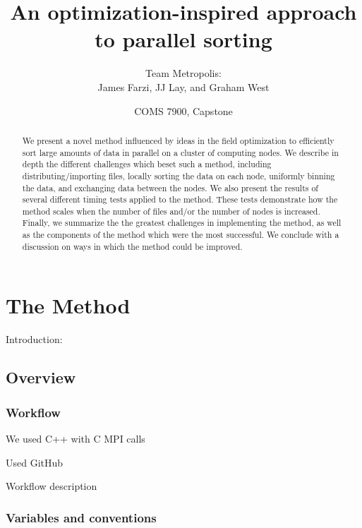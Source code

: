 \documentclass{article}
\begin{document}
\title{An optimization-inspired approach to parallel sorting}
\author{Team Metropolis: \\
		James Farzi, JJ Lay, and Graham West}
\date{COMS 7900, Capstone}

\maketitle

\begin{abstract}
We present a novel method influenced by ideas in the field optimization to efficiently sort large amounts of data in parallel on a cluster of computing nodes. We describe in depth the different challenges which beset such a method, including distributing/importing files, locally sorting the data on each node, uniformly binning the data, and exchanging data between the nodes. We also present the results of several different timing tests applied to the method. These tests demonstrate how the method scales when the number of files and/or the number of nodes is increased. Finally, we summarize the the greatest challenges in implementing the method, as well as the components of the method which were the most successful. We conclude with a discussion on ways in which the method could be improved.
\end{abstract}


\tableofcontents


\section{The Method}

Introduction:



\subsection{Overview}


\subsubsection{Workflow}
We used C++ with C MPI calls

Used GitHub

Workflow description


\subsubsection{Variables and conventions}
\end{document}
